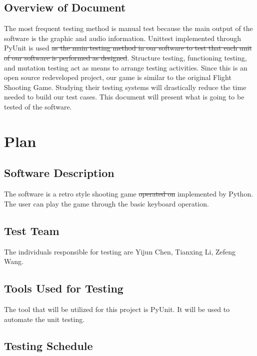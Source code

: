\documentclass[12pt, titlepage]{article}
\begin{document}
\subsection{Overview of Document}
{\color{red}The most frequent testing method is manual test because the main output of the software is the graphic and audio information.} Unittest implemented through PyUnit is used \sout{as the main testing method in our software to test that each unit of our software is performed as designed}. Structure testing, functioning testing, and mutation testing act as means to arrange testing activities. Since this is an open source redeveloped project, our game is similar to the original Flight Shooting Game. Studying their testing systems will drastically reduce the time needed to build our test cases. This document will present what is {\color{red} going} to be tested of the software.

\section{Plan}
	
	\subsection{Software Description}
	The software is a retro style shooting game \sout{operated on} {\color{red} implemented by} Python. The user can play the game through the basic keyboard operation.
	\subsection{Test Team}
	The individuals responsible for testing are Yijun Chen, Tianxing Li, Zefeng Wang. 
	\subsection{Tools Used for Testing}
		The tool that will be utilized for this project is PyUnit. It will be used to automate the unit testing. 
	\subsection{Testing Schedule}
		
\end{document}

